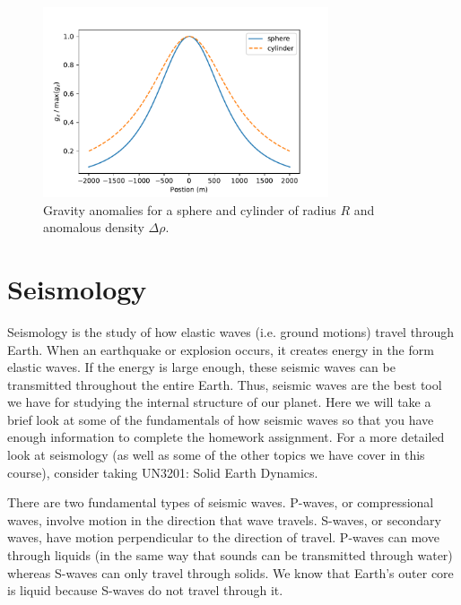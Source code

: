 \documentclass[11pt, oneside]{article}   	%
\begin{document}
\begin{figure}[htbp]
\begin{center}
\includegraphics[width=0.75\textwidth]{cylinder_sphere.pdf}
\caption{Gravity anomalies for a sphere and cylinder of radius $R$ and anomalous density $\Delta \rho$.}
\label{sphere}
\end{center}
\end{figure}


 
\clearpage
\section*{Seismology}
 Seismology is the study of how elastic waves (i.e. ground motions) travel through Earth. When an earthquake or explosion occurs, it creates energy in the form elastic waves. If the energy is large enough, these seismic waves can be transmitted throughout the entire Earth. Thus, seismic waves are the best tool we have for studying the internal structure of our planet.  Here we will take a brief look at some of the fundamentals of how seismic waves so that you have enough information to complete the homework assignment. For a more detailed look at seismology (as well as some of the other topics we have cover in this course), consider taking  UN3201: Solid Earth Dynamics.
 
There are two fundamental types of seismic waves. P-waves, or compressional waves, involve motion in the direction that wave travels. S-waves, or secondary waves, have motion perpendicular to the direction of travel. P-waves can move through liquids (in the same way that sounds can be transmitted through water) whereas S-waves can only travel through solids.    We know that Earth's outer core is liquid because S-waves do not travel through it.  
\end{document}
